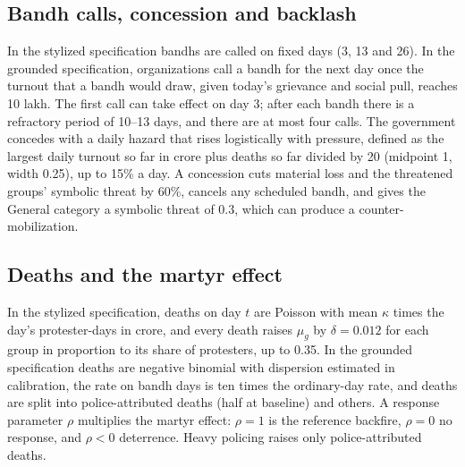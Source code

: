 \documentclass[11pt,a4paper]{article}
\begin{document}
\subsection{Bandh calls, concession and backlash}
In the stylized specification bandhs are called on fixed days (3, 13 and 26). In the grounded specification, organizations call a bandh for the next day once the turnout that a bandh would draw, given today's grievance and social pull, reaches 10 lakh. The first call can take effect on day 3; after each bandh there is a refractory period of 10--13 days, and there are at most four calls. The government concedes with a daily hazard that rises logistically with pressure, defined as the largest daily turnout so far in crore plus deaths so far divided by 20 (midpoint 1, width 0.25), up to 15\% a day. A concession cuts material loss and the threatened groups' symbolic threat by 60\%, cancels any scheduled bandh, and gives the General category a symbolic threat of 0.3, which can produce a counter-mobilization.

\subsection{Deaths and the martyr effect}
In the stylized specification, deaths on day $t$ are Poisson with mean $\kappa$ times the day's protester-days in crore, and every death raises $\mu_g$ by $\delta=0.012$ for each group in proportion to its share of protesters, up to 0.35. In the grounded specification deaths are negative binomial with dispersion estimated in calibration, the rate on bandh days is ten times the ordinary-day rate, and deaths are split into police-attributed deaths (half at baseline) and others. A response parameter $\rho$ multiplies the martyr effect: $\rho=1$ is the reference backfire, $\rho=0$ no response, and $\rho<0$ deterrence. Heavy policing raises only police-attributed deaths.
\end{document}
